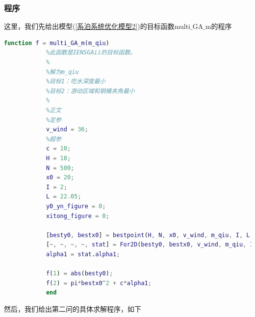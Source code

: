 \documentclass[UTF8]{ctexbook}
\theoremstyle{nonumberplain}
\begin{document}
        \subsubsection{程序}
            \par
            这里，我们先给出模型(\ref{系泊系统优化模型2})的目标函数multi$\_$GA$\_$m的程序
            \begin{lstlisting}[language = Matlab]
            function f = multi_GA_m(m_qiu)
            %此函数是IENSGAii的目标函数。
            %
            %解为m_qiu
            %目标1：吃水深度最小
            %目标2：游动区域和钢桶夹角最小
            %
            %正文
            %定参
            v_wind = 36;
            %超参
            c = 10;
            H = 18;
            N = 500;
            x0 = 20;
            I = 2;
            L = 22.05;
            y0_yn_figure = 0;
            xitong_figure = 0;

            [besty0, bestx0] = bestpoint(H, N, x0, v_wind, m_qiu, I, L, y0_yn_figure);
            [~, ~, ~, ~, stat] = For2D(besty0, bestx0, v_wind, m_qiu, I, L, xitong_figure);
            alpha1 = stat.alpha1;

            f(1) = abs(besty0);
            f(2) = pi*bestx0^2 + c*alpha1;
            end
            \end{lstlisting}
            然后，我们给出第二问的具体求解程序，如下
\end{document}
